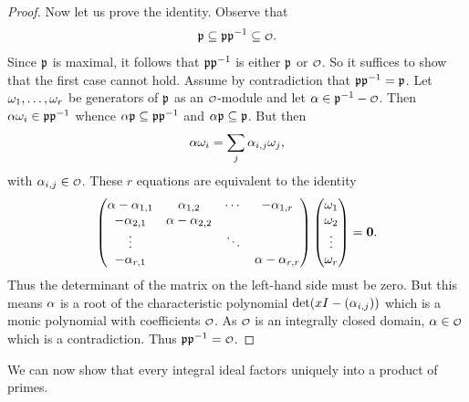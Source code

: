 \begin{proof}
      Now let us prove the identity. Observe that
      \[
        \mf{p} \subseteq \mf{p}\mf{p}^{-1} \subseteq \smc{O}.
      \]
      Since \(\mathfrak{p}\) is maximal, it follows that \(\mathfrak{p}\mathfrak{p}^{-1}\) is either \(\mathfrak{p}\) or \(\smc{O}\). So it suffices to show that the first case cannot hold. Assume by contradiction that \(\mathfrak{p}\mathfrak{p}^{-1} = \mathfrak{p}\). Let \(\omega_{1},\ldots,\omega_{r}\) be generators of \(\mathfrak{p}\) as an \(\smc{O}\)-module and let \(\a \in \mf{p}^{-1}-\smc{O}\). Then \(\alpha\omega_{i} \in \mathfrak{p}\mathfrak{p}^{-1}\) whence \(\alpha\mathfrak{p} \subseteq \mathfrak{p}\mathfrak{p}^{-1}\) and \(\alpha\mathfrak{p} \subseteq \mathfrak{p}\). But then
      \[
        \alpha\omega_{i} = \sum_{j}\alpha_{i,j}\omega_{j},
      \]
      with \(\a_{i,j} \in \smc{O}\). These \(r\) equations are equivalent to the identity
      \[
        \begin{pmatrix} \alpha-\alpha_{1,1} & \alpha_{1,2} & \cdots & -\alpha_{1,r} \\ -\alpha_{2,1} & \alpha-\alpha_{2,2} & & \\ \vdots & & \ddots & \\ -\alpha_{r,1} & & & \alpha-\alpha_{r,r} \end{pmatrix}\begin{pmatrix} \omega_{1} \\ \omega_{2} \\ \vdots \\ \omega_{r} \end{pmatrix} = \mathbf{0}.
      \]
      Thus the determinant of the matrix on the left-hand side must be zero. But this means \(\alpha\) is a root of the characteristic polynomial \(\det(xI-(\alpha_{i,j}))\) which is a monic polynomial with coefficients \(\smc{O}\). As \(\smc{O}\) is an integrally closed domain, \(\a \in \smc{O}\) which is a contradiction. Thus \(\mf{p}\mf{p}^{-1} = \smc{O}\).
    \end{proof}

    We can now show that every integral ideal factors uniquely into a product of primes.

